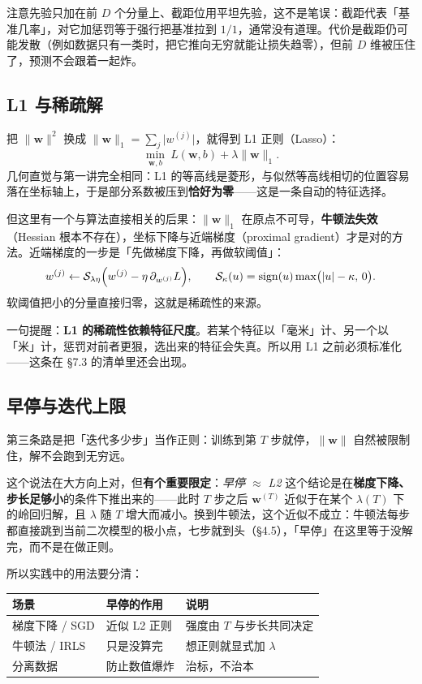 \documentclass[11pt,a4paper,fontset=windows,zihao=-4]{ctexart}
\newcommand{\bw}{\mathbf{w}}
\newcommand{\norm}[1]{\lVert #1\rVert}
\newcommand{\abs}[1]{\lvert #1\rvert}
\DeclareMathOperator{\sign}{sign}
\newcommand{\tabhead}{\sffamily\bfseries\color{navy}}
\begin{document}
注意先验只加在前 $D$ 个分量上、截距位用平坦先验，这不是笔误：截距代表「基准几率」，对它加惩罚等于强行把基准拉到 $1/1$，通常没有道理。代价是截距仍可能发散（例如数据只有一类时，把它推向无穷就能让损失趋零），但前 $D$ 维被压住了，预测不会跟着一起炸。

\subsection{L1 与稀疏解}

把 $\norm{\bw}^{2}$ 换成 $\norm{\bw}_{1}=\sum_j\abs{w^{(j)}}$，就得到 L1 正则（Lasso）：
\begin{equation}
  \min_{\bw,b}\ L(\bw,b)+\lambda\norm{\bw}_{1}.
\end{equation}
几何直觉与第一讲完全相同：L1 的等高线是菱形，与似然等高线相切的位置容易落在坐标轴上，于是部分系数被压到\textbf{恰好为零}——这是一条自动的特征选择。

但这里有一个与算法直接相关的后果：$\norm{\bw}_{1}$ 在原点不可导，\textbf{牛顿法失效}（Hessian 根本不存在），坐标下降与近端梯度（proximal gradient）才是对的方法。近端梯度的一步是「先做梯度下降，再做软阈值」：
\begin{equation}
  w^{(j)}\leftarrow \mathcal{S}_{\lambda\eta}\Bigl(w^{(j)}-\eta\,\partial_{w^{(j)}}L\Bigr),
  \qquad
  \mathcal{S}_{\kappa}(u)=\sign(u)\max\bigl(\abs{u}-\kappa,\,0\bigr).
\end{equation}
软阈值把小的分量直接归零，这就是稀疏性的来源。

一句提醒：\textbf{L1 的稀疏性依赖特征尺度}。若某个特征以「毫米」计、另一个以「米」计，惩罚对前者更狠，选出来的特征会失真。所以用 L1 之前必须标准化——这条在 \S7.3 的清单里还会出现。

\subsection{早停与迭代上限}

第三条路是把「迭代多少步」当作正则：训练到第 $T$ 步就停，$\norm{\bw}$ 自然被限制住，解不会跑到无穷远。

这个说法在大方向上对，但\textbf{有个重要限定}：\emph{早停 $\approx$ L2} 这个结论是在\textbf{梯度下降、步长足够小}的条件下推出来的——此时 $T$ 步之后 $\bw^{(T)}$ 近似于在某个 $\lambda(T)$ 下的岭回归解，且 $\lambda$ 随 $T$ 增大而减小。换到牛顿法，这个近似不成立：牛顿法每步都直接跳到当前二次模型的极小点，七步就到头（\S4.5），「早停」在这里等于没解完，而不是在做正则。

所以实践中的用法要分清：

\begin{center}
\small
\begin{tabular}{@{}lll@{}}
\toprule
\rowcolor{navy!7}
\tabhead 场景 & \tabhead 早停的作用 & \tabhead 说明\\
\midrule
梯度下降 / SGD & 近似 L2 正则 & 强度由 $T$ 与步长共同决定\\
牛顿法 / IRLS & 只是没算完 & 想正则就显式加 $\lambda$\\
分离数据 & 防止数值爆炸 & 治标，不治本\\
\bottomrule
\end{tabular}
\end{center}
\end{document}
